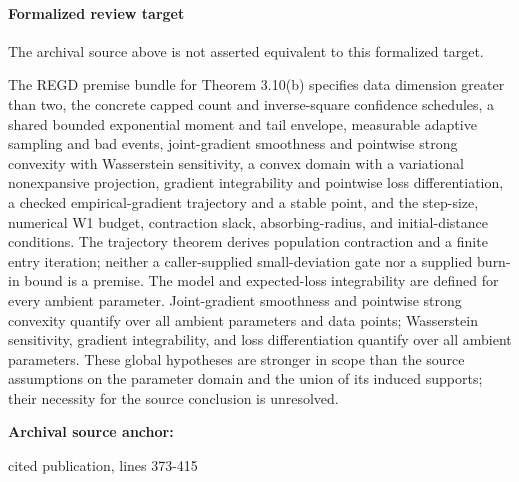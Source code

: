 \documentclass[10pt]{article}
\begin{document}
\paragraph{Formalized review target}
The archival source above is not asserted equivalent to this formalized target.
\begin{ReviewVerbatim}
The REGD premise bundle for Theorem 3.10(b) specifies data dimension greater than two, the concrete capped count and inverse-square confidence schedules, a shared bounded exponential moment and tail envelope, measurable adaptive sampling and bad events, joint-gradient smoothness and pointwise strong convexity with Wasserstein sensitivity, a convex domain with a variational nonexpansive projection, gradient integrability and pointwise loss differentiation, a checked empirical-gradient trajectory and a stable point, and the step-size, numerical W1 budget, contraction slack, absorbing-radius, and initial-distance conditions. The trajectory theorem derives population contraction and a finite entry iteration; neither a caller-supplied small-deviation gate nor a supplied burn-in bound is a premise. The model and expected-loss integrability are defined for every ambient parameter. Joint-gradient smoothness and pointwise strong convexity quantify over all ambient parameters and data points; Wasserstein sensitivity, gradient integrability, and loss differentiation quantify over all ambient parameters. These global hypotheses are stronger in scope than the source assumptions on the parameter domain and the union of its induced supports; their necessity for the source conclusion is unresolved.
\end{ReviewVerbatim}

\textbf{Archival source anchor:} {\footnotesize\raggedright cited publication, lines 373-\allowbreak{}415\par}
\end{document}
